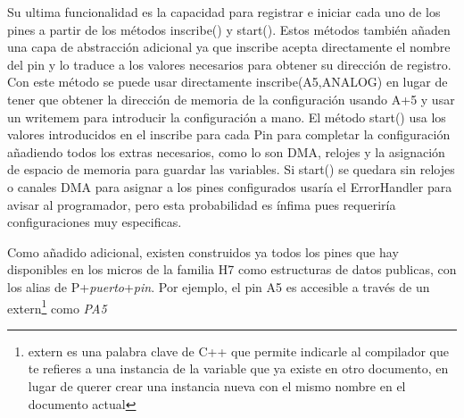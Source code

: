 \documentclass{report}
\begin{document}
Su ultima funcionalidad es la capacidad para registrar e iniciar cada uno de los pines a partir de los métodos inscribe() y start(). Estos métodos también añaden una capa de abstracción adicional ya que inscribe acepta directamente el nombre del pin y lo traduce a los valores necesarios para obtener su dirección de registro. Con este método se puede usar directamente inscribe(A5,ANALOG) en lugar de tener que obtener la dirección de memoria de la configuración usando A+5 y usar un writemem para introducir la configuración a mano. El método start() usa los valores introducidos en el inscribe para cada Pin para completar la configuración añadiendo todos los extras necesarios, como lo son DMA, relojes y la asignación de espacio de memoria para guardar las variables. Si start() se quedara sin relojes o canales DMA para asignar a los pines configurados usaría el ErrorHandler para avisar al programador, pero esta probabilidad es ínfima pues requeriría configuraciones muy especificas. \par \vspace{0.3 cm}
Como añadido adicional, existen construidos ya todos los pines que hay disponibles en los micros de la familia H7 como estructuras de datos publicas, con los alias de P+\textit{puerto}+\textit{pin}. Por ejemplo, el pin A5 es accesible a través de un extern\footnote{extern es una palabra clave de C++ que permite indicarle al compilador que te refieres a una instancia de la variable que ya existe en otro documento, en lugar de querer crear una instancia nueva con el mismo nombre en el documento actual} como \textit{PA5}
\end{document}
